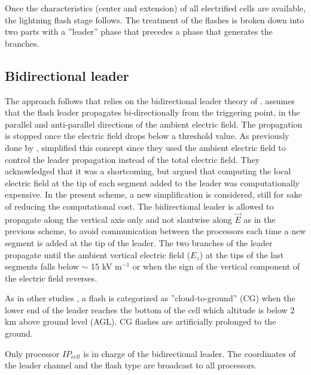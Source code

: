 Once the characteristics (center and extension) of all electrified cells are available, the lightning flash stage follows. 
The treatment of the flashes is broken down into two parts with a ''leader'' phase that precedes a phase that generates the branches. 

\subsection{Bidirectional leader}

The approach follows \citet{Helsdon-1992} that relies on the bidirectional leader theory of \citet{Kasemir-1960}.
\citeauthor{Kasemir-1960} assumes that the flash leader propagates bi-directionally from the triggering point, in the parallel and anti-parallel directions of the ambient electric field. 
The propagation is stopped once the electric field drops below a threshold value. 
As previously done by \citet{Helsdon-1992}, \citet{Barthe-Pinty-2007-flash} simplified this concept since they used the ambient electric field to control the leader propagation instead of the total electric field. 
They acknowledged that it was a shortcoming, but argued that computing the local electric field at the tip of each segment added to the leader was computationally expensive. 
In the present scheme, a new simplification is considered, still for sake of reducing the computational cost. 
The bidirectional leader is allowed to propagate along the vertical axis only and not slantwise along $\vec{E}$ as in the previous scheme, to avoid communication between the processors each time a new segment is added at the tip of the leader. 
The two branches of the leader propagate until the ambient vertical electric field ($E_z$) at the tips of the last segments falls below $\sim$ 15 kV m$^{-1}$ or when the sign of the vertical component of the electric field reverses.

As in other studies \citep{MacGorman-2001,Mansell-2002,Barthe-2005,Mansell-2005,Mansell-2010}, a flash is categorized as ''cloud-to-ground'' (CG) when the lower end of the leader reaches the bottom of the cell which altitude is below 2 km above ground level (AGL). CG flashes are artificially prolonged to the ground.

Only processor $IP_{cell}$ is in charge of the bidirectional leader. The coordinates of the leader channel and the flash type are broadcast to all processors.

